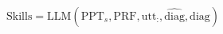 \begin{equation}
    \mathrm{Skills} = \mathrm{LLM}(\mathrm{PPT}_s, \mathrm{PRF}, \mathrm{utt}_{:}, \hat{\mathrm{diag}}, \mathrm{diag})
    \label{eq:skill generation}
\end{equation}

